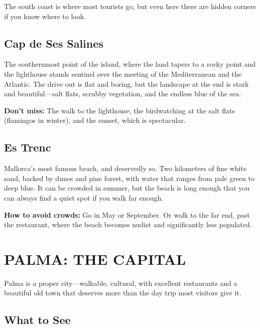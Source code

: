 \documentclass[
    language=english,
    doctype=travel-guide,
    institution=none,
]{../../omnilatex}
\begin{document}
The south coast is where most tourists go, but even here there are hidden corners if you know where to look.

\subsection{Cap de Ses Salines}

The southernmost point of the island, where the land tapers to a rocky point and the lighthouse stands sentinel over the meeting of the Mediterranean and the Atlantic. The drive out is flat and boring, but the landscape at the end is stark and beautiful---salt flats, scrubby vegetation, and the endless blue of the sea.

\textbf{Don't miss:} The walk to the lighthouse, the birdwatching at the salt flats (flamingos in winter), and the sunset, which is spectacular.

\subsection{Es Trenc}

Mallorca's most famous beach, and deservedly so. Two kilometers of fine white sand, backed by dunes and pine forest, with water that ranges from pale green to deep blue. It can be crowded in summer, but the beach is long enough that you can always find a quiet spot if you walk far enough.

\textbf{How to avoid crowds:} Go in May or September. Or walk to the far end, past the restaurant, where the beach becomes nudist and significantly less populated.

\section*{PALMA: THE CAPITAL}

Palma is a proper city---walkable, cultural, with excellent restaurants and a beautiful old town that deserves more than the day trip most visitors give it.

\subsection{What to See}
\end{document}
